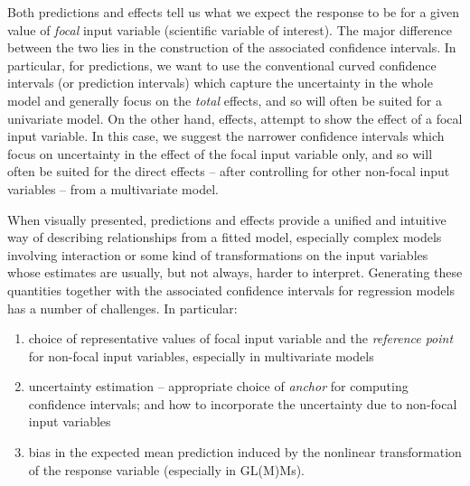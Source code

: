Both predictions and effects tell us what we expect the response to be for a given value of \emph{focal} input variable (scientific variable of interest). The major difference between the two lies in the construction of the associated confidence intervals. In particular, for predictions, we want to use the conventional curved confidence intervals (or prediction intervals) which capture the uncertainty in the whole model and generally focus on the \emph{total} effects, and so will often be suited for a univariate model. On the other hand, effects, attempt to show the effect of a focal input variable. In this case, we suggest the narrower confidence intervals which focus on uncertainty in the effect of the focal input variable only, and so will often be suited for the direct effects – after controlling for other non-focal input variables – from a multivariate model.

When visually presented, predictions and effects provide a unified and intuitive way of describing relationships from a fitted model, especially complex models involving interaction or some kind of transformations on the input variables whose estimates are usually, but not always, harder to interpret. Generating these quantities together with the associated confidence intervals for regression models has a number of challenges. In particular:
\begin{enumerate}
\item choice of representative values of focal input variable and the \emph{reference point} for non-focal input variables, especially in multivariate models
\item  uncertainty estimation -- appropriate choice of \emph{anchor} for computing confidence intervals; and how to incorporate the uncertainty due to non-focal input variables 
\item bias in the expected mean prediction induced by the nonlinear transformation of the response variable (especially in GL(M)Ms).
\end{enumerate}

